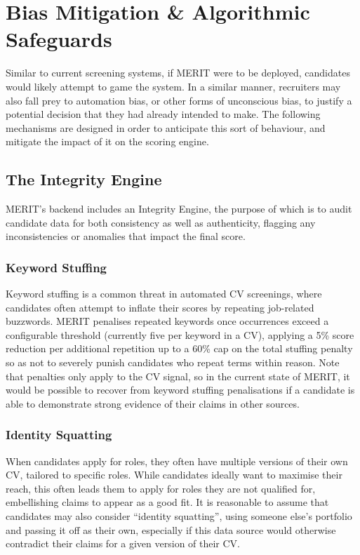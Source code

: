 \section{Bias Mitigation \& Algorithmic Safeguards}
\label{sec:bias-mitigation-safeguards}

Similar to current screening systems, if MERIT were to be deployed, candidates would likely attempt to game 
the system. In a similar manner, recruiters may also fall prey to automation bias, or other forms of unconscious bias,
to justify a potential decision that they had already intended to make. The following mechanisms are designed
in order to anticipate this sort of behaviour, and mitigate the impact of it on the scoring engine.


\subsection{The Integrity Engine}
MERIT's backend includes an Integrity Engine, the purpose of which is to audit candidate data for both
consistency as well as authenticity, flagging any inconsistencies or anomalies that impact the final
score.

\subsubsection{Keyword Stuffing}
Keyword stuffing is a common threat in automated CV screenings, where candidates often attempt to inflate their
scores by repeating job-related buzzwords. MERIT penalises repeated keywords once occurrences exceed a configurable
threshold (currently five per keyword in a CV), applying a 5\% score reduction per additional repetition up to a
60\% cap on the total stuffing penalty so as not to severely punish candidates who repeat terms within reason. Note that penalties only apply to the 
CV signal, so in the current state of MERIT, it would be possible to recover from keyword stuffing penalisations if a 
candidate is able to demonstrate strong evidence of their claims in other sources.


\subsubsection{Identity Squatting}
When candidates apply for roles, they often have multiple versions of their own CV, tailored to specific roles. 
While candidates ideally want to maximise their reach, this often leads them to apply for roles they are not 
qualified for, embellishing claims to appear as a good fit.
It is reasonable to assume that candidates may also consider ``identity squatting'',
using someone else's portfolio and passing it off as their own, especially if this data source would otherwise contradict their claims
for a given version of their CV.

